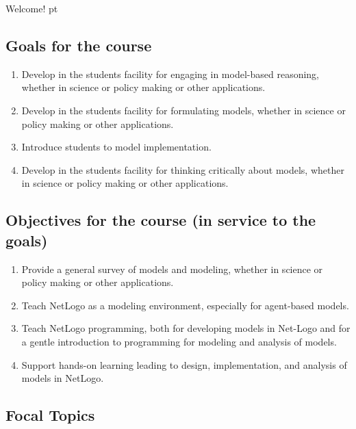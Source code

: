 Welcome!
 pt
\noindent 

\subsection{Goals for the course}

\begin{enumerate}
\item Develop in the students  facility for engaging in model-based
  reasoning, whether in science or policy making or other
  applications.
\item Develop in the students facility for formulating models, whether in science or policy making or other
  applications.
\item Introduce students to model implementation.
\item Develop in the students facility for thinking critically about
  models, whether in science or policy making or other
  applications.
\end{enumerate}

\subsection{Objectives for the course (in service to the goals)}

\begin{enumerate}
\item Provide a general survey of models and modeling, whether in science or policy making or other
  applications.
\item Teach NetLogo as a modeling environment, especially for
  agent-based models.
\item Teach NetLogo programming, both for developing models in Net{-}Logo
  and for a gentle introduction to programming for modeling and
  analysis of models.
\item Support hands-on learning leading to design, implementation, and analysis
  of models in NetLogo.
\end{enumerate}

\subsection{Focal Topics}

